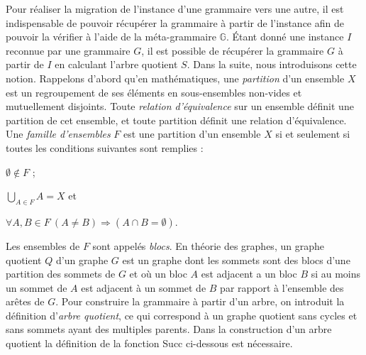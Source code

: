 Pour réaliser la migration de l'instance d'une grammaire vers une autre, il est indispensable de pouvoir récupérer la grammaire à partir de l'instance afin de pouvoir la vérifier à l'aide de la méta-grammaire $\mathbb{G}$.
Étant donné une instance $I$ reconnue par une grammaire $G$, il est possible de récupérer la grammaire $G$ à partir de $I$ en calculant l'arbre quotient $S$.
Dans la suite, nous introduisons cette notion.
Rappelons d'abord qu'en mathématiques, une \emph{partition} d'un ensemble $X$ est un regroupement de ses éléments en sous-ensembles non-vides et mutuellement disjoints.
Toute \emph{relation d'équivalence} sur un ensemble définit une partition de cet ensemble, et toute partition définit une relation d'équivalence.
Une \emph{famille d'ensembles} $F$ est une partition d'un ensemble $X$ si et seulement si toutes les conditions suivantes sont remplies :
\begin{enumerate*}[label=(\roman*)]
    \item $\emptyset \not\in F$ ;
    \item $\bigcup_{A \in F}A = X$ et
    \item $\forall A, B  \in F~ (A \neq B) \Rightarrow ( A \cap B = \emptyset)$.
\end{enumerate*}
Les ensembles de $F$ sont appelés \textit{blocs}.
En théorie des graphes, un graphe quotient $Q$ d'un graphe $G$ est un graphe dont les sommets sont des blocs d'une partition des sommets de $G$ et où un bloc $A$ est adjacent a un bloc $B$ si au moins un sommet de $A$ est adjacent à un sommet de $B$ par rapport à l'ensemble des arêtes de $G$.
Pour construire la grammaire à partir d'un arbre, on introduit la définition d'\textit{arbre quotient}, ce qui correspond à un graphe quotient sans cycles et sans sommets ayant des multiples parents.
Dans la construction d'un arbre quotient la définition de la fonction \textsf{Succ} ci-dessous est nécessaire.

